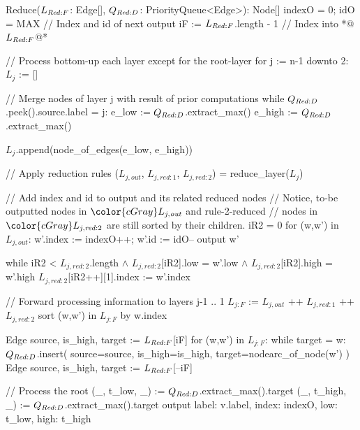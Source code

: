 \begin{blstlisting}
  Reduce($\ReduceLforward$: Edge[], $\ReduceQdep$: PriorityQueue<Edge>): Node[]
    indexO = 0; idO = MAX    // Index and id of next output
    iF := $\ReduceLforward$.length - 1         // Index into *@\color{cGray} $\ReduceLforward$@*

    // Process bottom-up each layer except for the root-layer
    for j := n-1 downto 2:
      $L_{j}$ := []

      // Merge nodes of layer j with result of prior computations
      while $\ReduceQdep$.peek().source.label = j:
        e_low  := $\ReduceQdep$.extract_max()
        e_high := $\ReduceQdep$.extract_max()

        $L_{j}$.append(node_of_edges(e_low, e_high))

      // Apply reduction rules
      ($L_{j,\mathit{out}}$, $L_{j,\mathit{red:}1}$, $L_{j,\mathit{red:}2}$) = reduce_layer($L_{j}$)

      // Add index and id to output and its related reduced nodes
      //   Notice, to-be outputted nodes in $\color{cGray}L_{j,\mathit{out}}$ and rule-2-reduced
      //   nodes in $\color{cGray}L_{j,\mathit{red:}2}$ are still sorted by their children.
      iR2 = 0
      for (w,w') in $L_{j,\mathit{out}}$:
        w'.index := indexO++; w'.id := idO--
        output w'

        while iR2 < $L_{j,\mathit{red:}2}$.length $\land$ $L_{j,\mathit{red:}2}$[iR2].low = w'.low
                                 $\land$ $L_{j,\mathit{red:}2}$[iR2].high = w'.high
          $L_{j,\mathit{red:}2}$[iR2++][1].index := w'.index

      // Forward processing information to layers j-1 .. 1
      $L_{j:F}$ := $L_{j,\mathit{out}}$ ++ $L_{j,\mathit{red:}1}$ ++ $L_{j,\mathit{red:}2}$
      sort (w,w') in $L_{j:F}$ by w.index

      Edge{ source, is_high, target } := $\ReduceLforward$[iF]
      for (w,w') in $L_{j:F}$:
        while target = w:
          $\ReduceQdep$.insert({
            source=source,
            is_high=is_high,
            target=nodearc_of_node(w')
          })
          Edge{ source, is_high, target } := $\ReduceLforward$[--iF]

    // Process the root
    (_, t_low,  _) := $\ReduceQdep$.extract_max().target
    (_, t_high, _) := $\ReduceQdep$.extract_max().target
    output { label: v.label, index: indexO, low: t_low, high: t_high }
\end{blstlisting}
